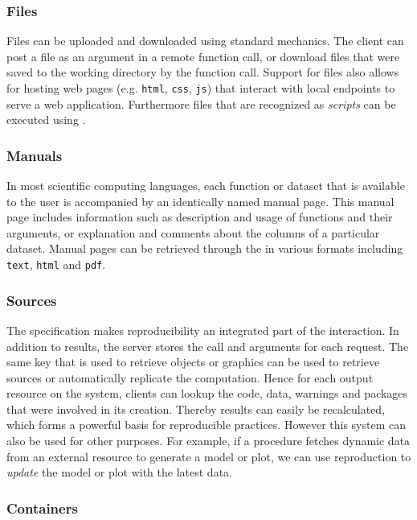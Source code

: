 \subsubsection{Files}

Files can be uploaded and downloaded using standard \HTTP mechanics. The client can post a file as an argument in a remote function call, or download files that were saved to the working directory by the function call. Support for files also allows for hosting web pages (e.g. \texttt{html}, \texttt{css}, \texttt{js}) that interact with local \API endpoints to serve a web application. Furthermore files that are recognized as \emph{scripts} can be executed using \RPC.

\subsubsection{Manuals}

In most scientific computing languages, each function or dataset that is available to the user is accompanied by an identically named manual page. This manual page includes information such as description and usage of functions and their arguments, or explanation and comments about the columns of a particular dataset. Manual pages can be retrieved through the \API in various formats including \texttt{text}, \texttt{html} and \texttt{pdf}.

\subsubsection{Sources}

The \OpenCPU specification makes reproducibility an integrated part of the \API interaction. In addition to results, the server stores the call and arguments for each \RPC request. The same key that is used to retrieve objects or graphics can be used to retrieve sources or automatically replicate the computation. Hence for each output resource on the system, clients can lookup the code, data, warnings and packages that were involved in its creation. Thereby results can easily be recalculated, which forms a powerful basis for reproducible practices. However this system can also be used for other purposes. For example, if a procedure fetches dynamic data from an external resource to generate a model or plot, we can use reproduction to \emph{update} the model or plot with the latest data.

\subsubsection{Containers}

